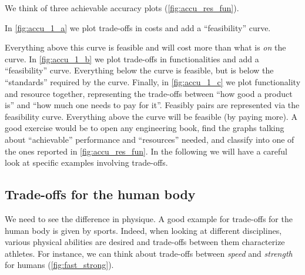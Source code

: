 We think of three achievable accuracy plots (\cref{fig:accu_res_fun}).

In \cref{fig:accu_1_a} we plot trade-offs in costs and add a ``feasibility'' curve.

\begin{figure*}[b]
    \centering
    \hspace{0.5cm}

    {}
    \hspace{0.5cm}
    \caption{}
    \label{fig:accu_res_fun}
\end{figure*}

Everything above this curve is feasible and will cost more than what is \emph{on} the curve.
In \cref{fig:accu_1_b} we plot trade-offs in functionalities and add a ``feasibility'' curve.
Everything below the curve is feasible, but is below the ``standards'' required by the curve.
Finally, in \cref{fig:accu_1_c} we plot functionality and resource together, representing the trade-offs between ``how good a product is'' and ``how much one needs to pay for it''.
Feasibly pairs are represented via the feasibility curve.
Everything above the curve will be feasible (by paying more).
A good exercise would be to open any engineering book, find the graphs talking about ``achievable'' performance and ``resources'' needed, and classify into one of the ones reported in \cref{fig:accu_res_fun}.
In the following we will have a careful look at specific examples involving trade-offs.

\vfill
\clearpage

\subsection{Trade-offs for the human body}

We need to see the difference in physique.
A good example for trade-offs for the human body is given by sports.
Indeed, when looking at different disciplines, various physical abilities are desired and trade-offs between them characterize athletes.
For instance, we can think about trade-offs between \emph{speed} and \emph{strength} for humans (\cref{fig:fast_strong}).

\begin{marginfigure}
    \centering
    \caption{}
    \label{fig:fast_strong}
\end{marginfigure}

